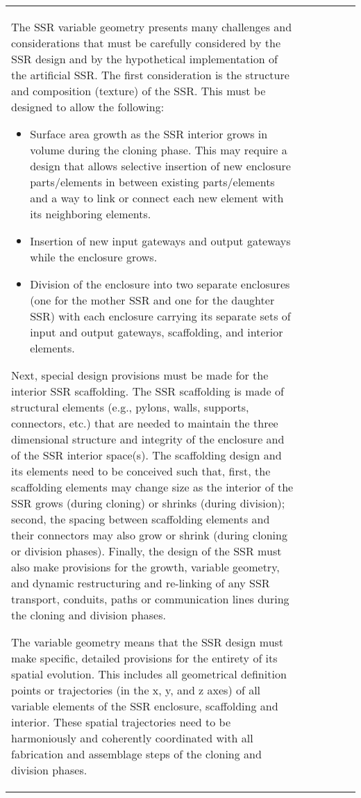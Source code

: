 \begin{table}[h]
\begin{center}
\begin{tabular}{| l l l l l l |}
The SSR variable geometry presents many challenges and considerations that must
be carefully considered by the SSR design and by the hypothetical
implementation of the artificial SSR.  
The first consideration is the structure and composition (texture) of the SSR.  This
must be designed to allow the following:
\begin{itemize}
\item Surface area growth as the SSR interior grows in volume during the
cloning phase. This may require a design that allows selective
insertion of new enclosure parts/elements in between existing
parts/elements and a way to link or connect each new
element with its neighboring elements.
\item Insertion of new input gateways and output gateways while the enclosure grows.
\item Division of the enclosure into two separate enclosures (one for
the mother SSR and one for the daughter SSR)  with each enclosure
carrying its separate sets of input and output gateways, 
scaffolding, and interior elements.
\end{itemize}

Next, special design provisions must be made for the interior SSR
scaffolding. The SSR scaffolding is made of structural
elements (e.g., pylons, walls, supports, connectors, etc.) that are needed to
maintain the three dimensional structure and integrity of the enclosure
and of the SSR interior space(s). The scaffolding design and its
elements need to be conceived such that, first, the scaffolding elements may
change size as the
interior of the SSR grows (during cloning) or shrinks (during division);
second, the spacing between scaffolding elements and their connectors may
also grow or shrink (during cloning or division phases).  
Finally, the design of the SSR must also make provisions for the growth,
variable geometry, and dynamic restructuring and re-linking of any SSR
transport, conduits, paths or communication lines during the cloning
and division phases.

The variable geometry means that the SSR design must make specific,
detailed provisions for the entirety of its spatial evolution. This includes all geometrical
definition points or trajectories (in the x, y, and z axes) of all variable
elements of the SSR enclosure, scaffolding and interior. These spatial
trajectories need to be harmoniously and coherently coordinated with
all fabrication and assemblage steps of the cloning and division
phases.
\index{self-replication!growth and development|)}


\end{tabular}
\end{center}
\end{table}
